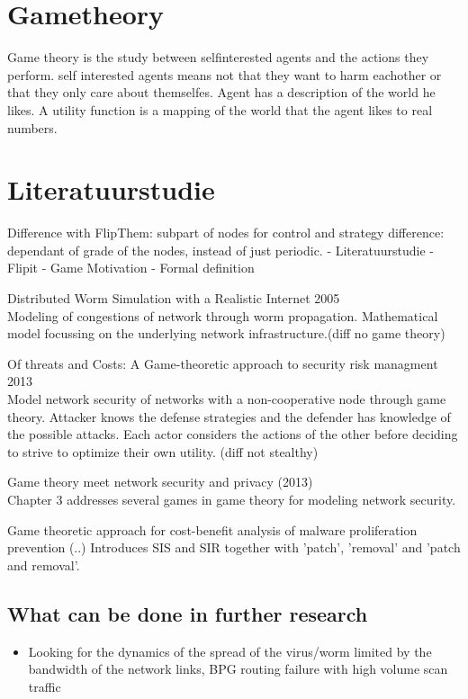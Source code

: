 \documentclass[10pt]{article}
\begin{document}
\section{Gametheory}

Game theory is the study between selfinterested agents and the actions they perform. self interested agents means not that they want to harm eachother or that they only care about themselfes. Agent has a description of the world he likes. A utility function is a mapping of the world that the agent likes to real numbers. 


\section{Literatuurstudie}

Difference with FlipThem: subpart of nodes for control and strategy difference: dependant of grade of the nodes, instead of just periodic.
- Literatuurstudie
- Flipit
- Game Motivation
- Formal definition


\begin{description}
\item Distributed Worm Simulation with a Realistic Internet 2005  \\
Modeling of congestions of network through worm propagation. Mathematical model focussing on the underlying network infrastructure.(diff no game theory) 
\item Of threats and Costs: A Game-theoretic approach to security risk managment 2013\\
Model network security of networks with a non-cooperative node through game theory. Attacker knows the defense strategies and the defender has knowledge of the possible attacks. Each actor considers the actions of the other before deciding to strive to optimize their own utility. (diff not stealthy)
\item Game theory meet network security and privacy (2013) \\
Chapter 3 addresses several games in game theory for modeling network security.
\item Game theoretic approach for cost-benefit analysis of malware proliferation prevention (..)
Introduces SIS and SIR together with 'patch', 'removal' and 'patch and removal'.
\end{description}

\subsection{What can be done in further research}
\begin{itemize}
\item Looking for the dynamics of the spread of the virus/worm limited by the bandwidth of the network links, BPG routing failure with high volume scan traffic
\end{itemize}
\end{document}
